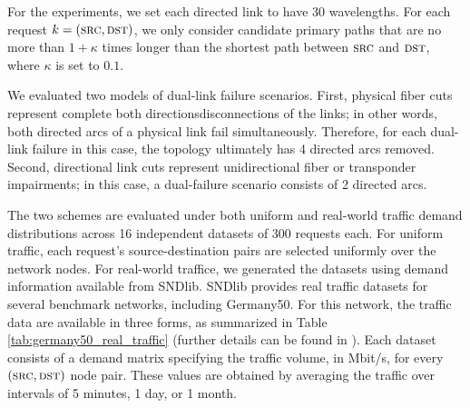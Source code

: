 \documentclass[conference]{IEEEtran}
\def \DST       {\textsc{dst}}
\def \RequestIdx       {k}
\def \SRC       {\textsc{src}}
\newcommand{\Huy}[1]{\noindent{\color{blue}[\textsc{Huy:} #1]}\xspace}
\begin{document}
For the experiments, we set each directed link to have 30 wavelengths. For each request $\RequestIdx = (\SRC, \DST)$, we only consider candidate primary paths that are no more than $1 + \kappa$ times longer than the shortest path between $\SRC$ and $\DST$, where $\kappa$ is set to $0.1$.
\Huy{Need to run with $\kappa = 0.5$ to see the effect of allowing more paths}

We evaluated two models of dual-link failure scenarios. First, physical fiber cuts represent complete both directionsdisconnections of the links; in other words, both directed arcs of a physical link fail simultaneously. Therefore, for each dual-link failure in this case, the topology ultimately has 4 directed arcs removed. Second, directional link cuts represent unidirectional fiber or transponder impairments; in this case, a dual-failure scenario consists of 2 directed arcs.

\Huy{If we increase $\kappa$, then 300 requests may not enough to evaluate performance of the two algorithms. So, if we test with $\kappa = 0.5$, we should increase the number of requests to 1000?.}

The two schemes are evaluated under both uniform and real-world traffic demand distributions across 16 independent datasets of 300 requests each. For uniform traffic, each request's source-destination pairs are selected uniformly over the network nodes. For real-world traffice, we generated the datasets using demand information available from SNDlib. SNDlib provides real traffic datasets for several benchmark networks, including Germany50. For this network, the traffic data are available in three forms, as summarized in Table \ref{tab:germany50_real_traffic} (further details can be found in \cite{OrlowskiPioroTomaszewskiWessaely2010}). Each dataset consists of a demand matrix specifying the traffic volume, in Mbit/s, for every $(\SRC, \DST)$ node pair. These values are obtained by averaging the traffic over intervals of 5 minutes, 1 day, or 1 month.

\begin{table}[t]
\begin{center}
\caption{Germany50 real traffic description}
\label{tab:germany50_real_traffic}
\end{center}
\end{table}
\end{document}
